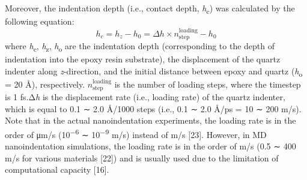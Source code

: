 \documentclass{article}
\begin{document}
Moreover, the indentation depth (i.e., contact depth, \emph{h}\textsubscript{c}) was calculated by the following equation:
\begin{equation}
h_c=h_z-h_0=\Delta h\times n_{\mathrm{step}}^{\mathrm{loading}}-h_0\tag{5}
\end{equation}
where \emph{h}\textsubscript{c}, \emph{h}\textsubscript{z}, \emph{h}\textsubscript{o} are the indentation depth (corresponding to the depth of indentation into the epoxy resin substrate), the displacement of the quartz indenter along \emph{z}-direction, and the initial distance between epoxy and quartz (\emph{h}\textsubscript{o} = 20 Å), respectively. $n_{\mathrm{step}}^{\mathrm{loading}}$ is the number of loading steps, where the timestep is 1 fs.Δ\emph{h} is the displacement rate (i.e., loading rate) of the quartz indenter, which is equal to 0.1 ∼ 2.0 Å/1000 steps (i.e., 0.1 ∼ 2.0 Å/ps = 10 ∼ 200 m/s). Note that in the actual nanoindentation experiments, the loading rate is in the order of μm/s (10\textsuperscript{−6} ∼ 10\textsuperscript{−9} m/s) instead of m/s [23]. However, in MD nanoindentation simulations, the loading rate is in the order of m/s (0.5 ∼ 400 m/s for various materials [22]) and is usually used due to the limitation of computational capacity [16].
\end{document}
